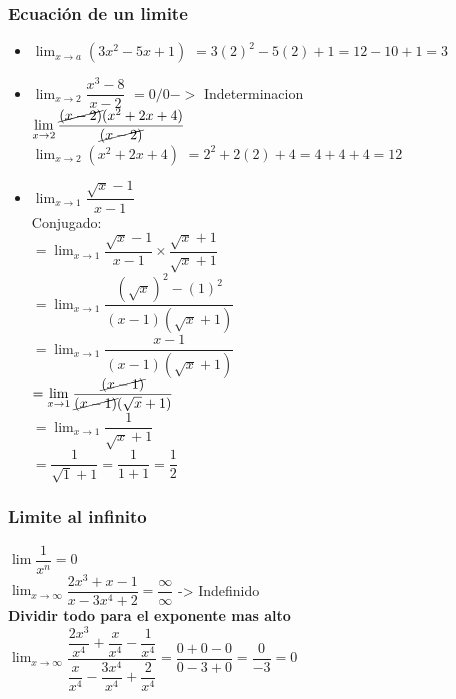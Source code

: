 \documentclass[stu, 12pt, a4paper, donotrepeattitle, floatsintext, natbib]{apa7}
\begin{document}
    \subsubsection{Ecuación de un limite}
    \begin{itemize}
        \item $\displaystyle\lim_{x \to a} (3x^2 -5x +1)$
        \hspace{2cm} $= 3(2)^2-5(2)+1 = 12-10+1 = 3$ \\[0.5cm]

        \item $\displaystyle\lim_{x \to 2} \dfrac{x^3-8}{x-2}$ \hspace{3cm} $=0/0 ->$ Indeterminacion \\[0.5cm]
        $\displaystyle\lim_{x \to 2}\dfrac{\cancel{(x-2)}(x^2+2x+4)}{\cancel{(x-2)}}$\\[0.5cm]
        $\displaystyle\lim_{x \to 2}(x^2+2x+4)$\hspace{1cm} $= 2^2+2(2)+4 = 4+4+4 = 12$\\[0.5cm]

        \item $\displaystyle\lim_{x\to 1} \dfrac{\sqrt {x}-1}{x-1}$\\[0.5cm]
        Conjugado: \\[0.5cm]
        $ = \displaystyle\lim_{x\to1} \dfrac{\sqrt {x}-1}{x-1} \times \dfrac{\sqrt {x}+1}{\sqrt {x}+1}$\\[0.5cm]
        $ = \displaystyle\lim_{x\to1} \dfrac{(\sqrt {x})^2 - (1)^2}{(x-1)(\sqrt {x}+1)}$\\[0.5cm]
        $ = \displaystyle\lim_{x\to1} \dfrac{x-1}{(x-1)(\sqrt {x}+1)}$\\[0.5cm]
        $ = \displaystyle\lim_{x\to1} \dfrac{\cancel{(x-1)}}{\cancel{(x-1)}(\sqrt {x}+1)}$\\[0.5cm]
        $ = \displaystyle\lim_{x\to1} \dfrac{1}{\sqrt {x}+1}$\\[0.5cm]
        $ = \dfrac{1}{\sqrt {1}+1} = \dfrac{1}{1+1} = \dfrac{1}{2}$\\[0.5cm]
    \end{itemize}

    \subsubsection{Limite al infinito}
    $\displaystyle\lim \dfrac{1}{x^n} = 0$ \\[0.5cm]
    $\displaystyle\lim_{x \to \infty} \dfrac{2x^3+x-1}{x-3x^4+2} = \dfrac{\infty}{\infty} $\hspace{2cm} -> Indefinido\\[0.5cm]
    \textbf{Dividir todo para el exponente mas alto}\\[0.5cm]
    $\displaystyle\lim_{x \to \infty} \dfrac{\dfrac{2x^3}{x^4}+\dfrac{x}{x^4}-\dfrac{1}{x^4}}{\dfrac{x}{x^4}-\dfrac{3x^4}{x^4}+\dfrac{2}{x^4}} = \dfrac{0+0-0}{0-3+0} = \dfrac{0}{-3} = 0$\\[0.5cm]
\end{document}
